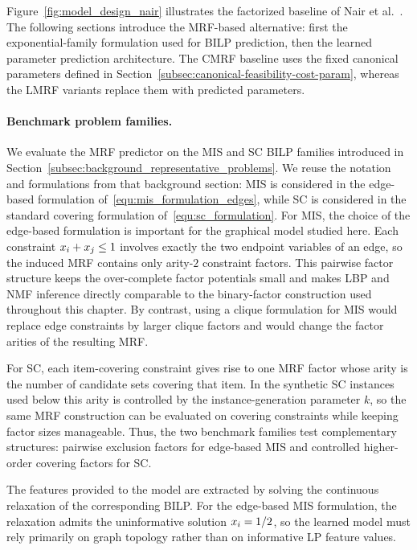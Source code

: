 Figure~\ref{fig:model_design_nair} illustrates the factorized baseline of Nair et al.~\cite{nair_solving_2020}. The following sections introduce the MRF-based alternative: first the exponential-family formulation used for BILP prediction, then the learned parameter prediction architecture. The CMRF baseline uses the fixed canonical parameters defined in Section~\ref{subsec:canonical-feasibility-cost-param}, whereas the LMRF variants replace them with predicted parameters.



\paragraph{Benchmark problem families.}
We evaluate the MRF predictor on the MIS and SC BILP families introduced in Section~\ref{subsec:background_representative_problems}. We reuse the notation and formulations from that background section: MIS is considered in the edge-based formulation of~\eqref{equ:mis_formulation_edges}, while SC is considered in the standard covering formulation of~\eqref{equ:sc_formulation}. For MIS, the choice of the edge-based formulation is important for the graphical model studied here. Each constraint $x_i+x_j\leq 1$ involves exactly the two endpoint variables of an edge, so the induced MRF contains only arity-$2$ constraint factors. This pairwise factor structure keeps the over-complete factor potentials small and makes LBP and NMF inference directly comparable to the binary-factor construction used throughout this chapter. By contrast, using a clique formulation for MIS would replace edge constraints by larger clique factors and would change the factor arities of the resulting MRF.

For SC, each item-covering constraint gives rise to one MRF factor whose arity is the number of candidate sets covering that item. In the synthetic SC instances used below this arity is controlled by the instance-generation parameter $k$, so the same MRF construction can be evaluated on covering constraints while keeping factor sizes manageable. Thus, the two benchmark families test complementary structures: pairwise exclusion factors for edge-based MIS and controlled higher-order covering factors for SC.

The features provided to the model are extracted by solving the continuous relaxation of the corresponding BILP. For the edge-based MIS formulation, the relaxation admits the uninformative solution $x_i=1/2$, so the learned model must rely primarily on graph topology rather than on informative LP feature values.

